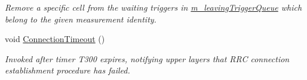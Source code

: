\begin{DoxyCompactItemize}
\begin{DoxyCompactList}\small\item\em Remove a specific cell from the waiting triggers in \hyperlink{classns3_1_1LteUeRrc_a7984d05cbcc51cd9239a22bd7e400d06}{m\+\_\+leaving\+Trigger\+Queue} which belong to the given measurement identity. \end{DoxyCompactList}\item 
void \hyperlink{classns3_1_1LteUeRrc_abc995027c961ea69eb6722ffc429881a}{Connection\+Timeout} ()
\begin{DoxyCompactList}\small\item\em Invoked after timer T300 expires, notifying upper layers that R\+RC connection establishment procedure has failed. \end{DoxyCompactList}\end{DoxyCompactItemize}
